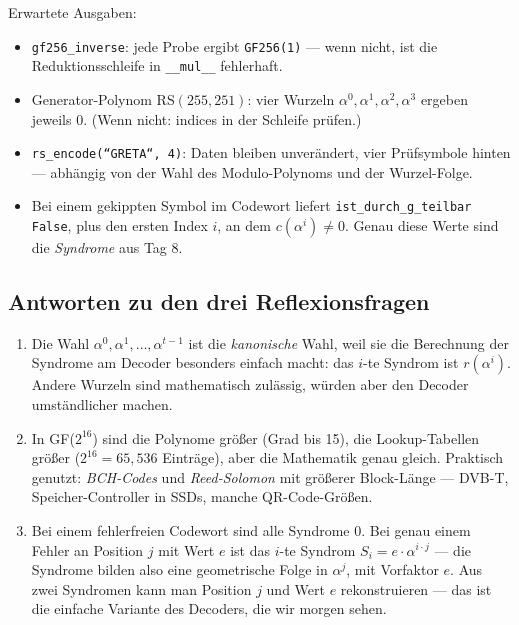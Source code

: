Erwartete Ausgaben:

\begin{itemize}
\item \texttt{gf256\_inverse}: jede Probe ergibt \texttt{GF256(1)} —
  wenn nicht, ist die Reduktionsschleife in \texttt{\_\_mul\_\_}
  fehlerhaft.
\item Generator-Polynom RS$(255, 251)$: vier Wurzeln
  $\alpha^0, \alpha^1, \alpha^2, \alpha^3$ ergeben jeweils $0$.
  (Wenn nicht: indices in der Schleife prüfen.)
\item \texttt{rs\_encode(“GRETA“, 4)}: Daten bleiben unverändert,
  vier Prüfsymbole hinten — abhängig von der Wahl des
  Modulo-Polynoms und der Wurzel-Folge.
\item Bei einem gekippten Symbol im Codewort liefert
  \texttt{ist\_durch\_g\_teilbar} \texttt{False}, plus den ersten
  Index $i$, an dem $c(\alpha^i) \ne 0$. Genau diese Werte sind die
  \emph{Syndrome} aus Tag 8.
\end{itemize}

\subsection*{Antworten zu den drei Reflexionsfragen}

\begin{enumerate}
\item Die Wahl $\alpha^0, \alpha^1, \dots, \alpha^{t-1}$ ist die
  \emph{kanonische} Wahl, weil sie die Berechnung der Syndrome am
  Decoder besonders einfach macht: das $i$-te Syndrom ist $r(\alpha^i)$.
  Andere Wurzeln sind mathematisch zulässig, würden aber den Decoder
  umständlicher machen.

\item In GF($2^{16}$) sind die Polynome größer (Grad bis 15), die
  Lookup-Tabellen größer ($2^{16} = 65{,}536$ Einträge), aber die
  Mathematik genau gleich. Praktisch genutzt: \emph{BCH-Codes} und
  \emph{Reed-Solomon} mit größerer Block-Länge — DVB-T,
  Speicher-Controller in SSDs, manche QR-Code-Größen.

\item Bei einem fehlerfreien Codewort sind alle Syndrome $0$. Bei
  genau einem Fehler an Position $j$ mit Wert $e$ ist das $i$-te
  Syndrom $S_i = e \cdot \alpha^{i \cdot j}$ — die Syndrome bilden
  also eine geometrische Folge in $\alpha^j$, mit Vorfaktor $e$. Aus
  zwei Syndromen kann man Position $j$ und Wert $e$ rekonstruieren —
  das ist die einfache Variante des Decoders, die wir morgen sehen.
\end{enumerate}
